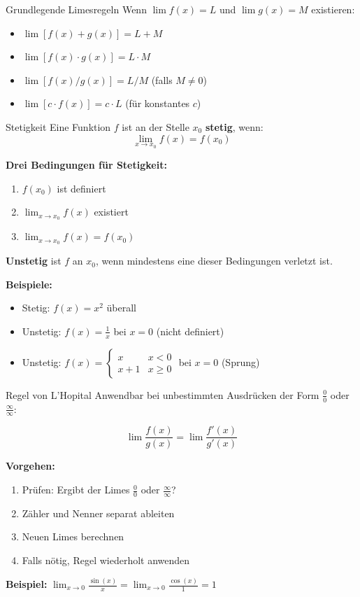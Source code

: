 \documentclass[a4paper,fontsize = 7pt]{scrartcl}
\begin{document}
\begin{mainbox}{Grundlegende Limesregeln}
    Wenn $\lim f(x) = L$ und $\lim g(x) = M$ existieren:
    \begin{itemize}
        \item $\lim [f(x) + g(x)] = L + M$
        \item $\lim [f(x) \cdot g(x)] = L \cdot M$
        \item $\lim [f(x) / g(x)] = L / M$ (falls $M \neq 0$)
        \item $\lim [c \cdot f(x)] = c \cdot L$ (für konstantes $c$)
    \end{itemize}
\end{mainbox}

\begin{subbox}{Stetigkeit}
    Eine Funktion $f$ ist an der Stelle $x_0$ \textbf{stetig}, wenn:
    $$\lim_{x \to x_0} f(x) = f(x_0)$$

    \textbf{Drei Bedingungen für Stetigkeit:}
    \begin{enumerate}
        \item $f(x_0)$ ist definiert
        \item $\lim_{x \to x_0} f(x)$ existiert
        \item $\lim_{x \to x_0} f(x) = f(x_0)$
    \end{enumerate}

    \textbf{Unstetig} ist $f$ an $x_0$, wenn mindestens eine dieser Bedingungen verletzt ist.

    \textbf{Beispiele:}
    \begin{itemize}
        \item Stetig: $f(x) = x^2$ überall
        \item Unstetig: $f(x) = \frac{1}{x}$ bei $x = 0$ (nicht definiert)
        \item Unstetig: $f(x) = \begin{cases} x & x < 0 \\ x+1 & x \geq 0 \end{cases}$ bei $x = 0$ (Sprung)
    \end{itemize}
\end{subbox}

\begin{mainbox}{Regel von L'Hopital}
    Anwendbar bei unbestimmten Ausdrücken der Form $\frac{0}{0}$ oder $\frac{\infty}{\infty}$:

    $$\lim \frac{f(x)}{g(x)} = \lim \frac{f'(x)}{g'(x)}$$

    \textbf{Vorgehen:}
    \begin{enumerate}
        \item Prüfen: Ergibt der Limes $\frac{0}{0}$ oder $\frac{\infty}{\infty}$?
        \item Zähler und Nenner separat ableiten
        \item Neuen Limes berechnen
        \item Falls nötig, Regel wiederholt anwenden
    \end{enumerate}

    \textbf{Beispiel:} $\lim_{x \to 0} \frac{\sin(x)}{x} = \lim_{x \to 0} \frac{\cos(x)}{1} = 1$
\end{mainbox}
\end{document}
